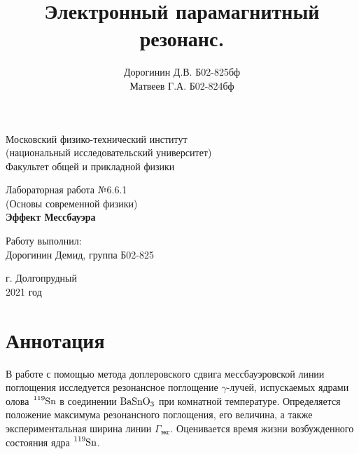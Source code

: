 \documentclass[a4paper,12pt]{article}
\date{\vspace{-10pt}}
\author{Дорогинин Д.В. Б02-825бф\\
Матвеев Г.А. Б02-824бф}
\title{\textbf{Электронный парамагнитный резонанс.}}
\theoremstyle{definition}
\begin{document}
\begin{titlepage}
	\begin{center}
		\large 	Московский физико-технический институт \\
		(национальный исследовательский университет) \\
		Факультет общей и прикладной физики \\
		\vspace{0.2cm}
		
		\vspace{4.5cm}
		Лабораторная работа №6.6.1  \\ \vspace{0.2cm}
		\large (Основы современной физики) \\ \vspace{0.2cm}
		\LARGE \textbf{ Эффект Мессбауэра  }
	\end{center}
	\vspace{2.3cm} \large
	
	\begin{center}
		Работу выполнил: \\
		Дорогинин Демид,
		группа Б02-825
		\vspace{10mm}			
	\end{center}
		
	\begin{center} \vspace{60mm}
		г. Долгопрудный \\
		2021 год
	\end{center}
\end{titlepage}


\section*{Аннотация}
В работе с помощью метода доплеровского сдвига мессбауэровской линии поглощения исследуется резонансное поглощение $\gamma$-лучей, испускаемых ядрами олова $\ce{^119Sn}$ в соединении $\ce{BaSnO3}$ при комнатной температуре. Определяется положение максимума резонансного поглощения, его величина, а также экспериментальная ширина линии $\Gamma_\text{экс}$. Оценивается время жизни возбужденного состояния ядра $\ce{^119Sn}$.
\end{document}
